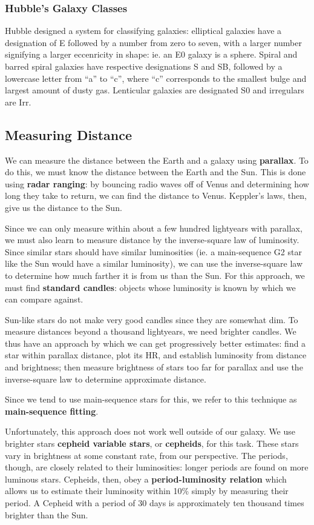 \subsubsection{Hubble's Galaxy Classes}
Hubble designed a system for classifying galaxies: elliptical galaxies have a designation of E followed by a number from zero to seven, with a larger number signifying a larger eccenricity in shape: ie. an E0 galaxy is a sphere. Spiral and barred spiral galaxies have respective designations S and SB, followed by a lowercase letter from ``a'' to ``c'', where ``c'' corresponds to the smallest bulge and largest amount of dusty gas. Lenticular galaxies are designated S0 and irregulars are Irr.

\subsection{Measuring Distance}
We can measure the distance between the Earth and a galaxy using {\bf parallax}. To do this, we must know the distance between the Earth and the Sun. This is done using {\bf radar ranging}: by bouncing radio waves off of Venus and determining how long they take to return, we can find the distance to Venus. Keppler's laws, then, give us the distance to the Sun.

Since we can only measure within about a few hundred lightyears with parallax, we must also learn to measure distance by the inverse-square law of luminosity. Since similar stars should have similar luminosities (ie. a main-sequence G2 star like the Sun would have a similar luminosity), we can use the inverse-square law to determine how much farther it is from us than the Sun. For this approach, we must find {\bf standard candles}: objects whose luminosity is known by which we can compare against.

Sun-like stars do not make very good candles since they are somewhat dim. To measure distances beyond a thousand lightyears, we need brighter candles. We thus have an approach by which we can get progressively better estimates: find a star within parallax distance, plot its HR, and establish luminosity from distance and brightness; then measure brightness of stars too far for parallax and use the inverse-square law to determine approximate distance.

Since we tend to use main-sequence stars for this, we refer to this technique as {\bf main-sequence fitting}.

Unfortunately, this approach does not work well outside of our galaxy. We use brighter stars {\bf cepheid variable stars}, or {\bf cepheids}, for this task. These stars vary in brightness at some constant rate, from our perspective. The periods, though, are closely related to their luminosities: longer periods are found on more luminous stars. Cepheids, then, obey a {\bf period-luminosity relation} which allows us to estimate their luminosity within 10\% simply by measuring their period. A Cepheid with a period of 30 days is approximately ten thousand times brighter than the Sun.

